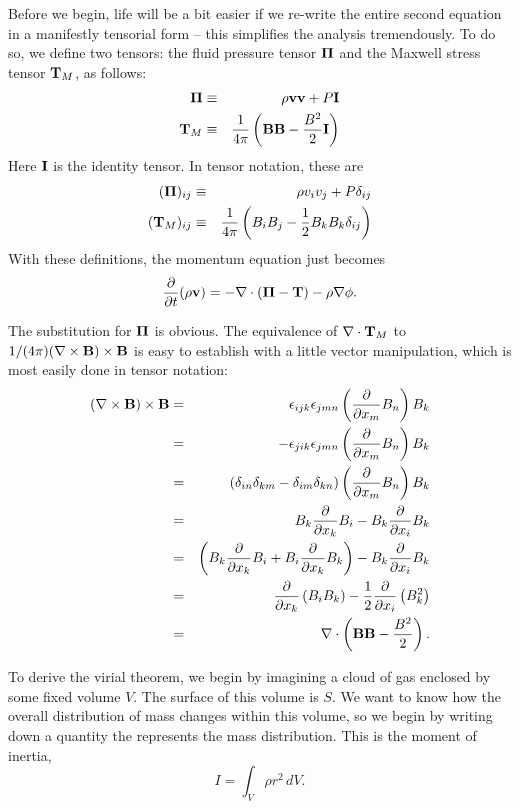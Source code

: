 Before we begin, life will be a bit easier if we re-write the entire second equation in a manifestly tensorial form -- this simplifies the analysis tremendously. To do so, we define two tensors: the fluid pressure tensor $\boldsymbol{\Pi}$ and the Maxwell stress tensor $\mathbf{T}_M$, as follows:
\begin{eqnarray}
\boldsymbol{\Pi} & \equiv & \rho \mathbf{v}\mathbf{v} + P\mathbf{I} \\
\mathbf{T}_M & \equiv & \frac{1}{4\pi} \left(\mathbf{B}\mathbf{B} - \frac{B^2}{2}\mathbf{I}\right)
\end{eqnarray}
Here $\mathbf{I}$ is the identity tensor. In tensor notation, these are
\begin{eqnarray}
(\boldsymbol{\Pi})_{ij} & \equiv & \rho v_i v_j + P \delta_{ij} \\
(\mathbf{T}_M)_{ij} & \equiv & \frac{1}{4\pi} \left(B_i B_j - \frac{1}{2}B_k B_k \delta_{ij}\right)
\end{eqnarray}
With these definitions, the momentum equation just becomes
\begin{equation}
\frac{\partial}{\partial t}(\rho \mathbf{v}) = -\nabla\cdot(\boldsymbol{\Pi}-\mathbf{T}) - \rho \nabla\phi.
\end{equation}

The substitution for $\boldsymbol{\Pi}$ is obvious. The equivalence of $\nabla\cdot\mathbf{T}_M$ to $1/(4\pi) (\nabla\times\mathbf{B})\times\mathbf{B}$ is easy to establish with a little vector manipulation, which is most easily done in tensor notation:
\begin{eqnarray}
(\nabla\times\mathbf{B})\times\mathbf{B} & = & \epsilon_{ijk} \epsilon_{jmn} \left(\frac{\partial}{\partial x_m}B_n\right) B_k \\
& = & -\epsilon_{jik} \epsilon_{jmn} \left(\frac{\partial}{\partial x_m}B_n\right) B_k \\
& = & (\delta_{in}\delta_{km}-\delta_{im}\delta_{kn})\left(\frac{\partial}{\partial x_m}B_n\right) B_k \\
& = & B_k\frac{\partial}{\partial x_k} B_i - B_k\frac{\partial}{\partial x_i} B_k \\
& = & \left(B_k\frac{\partial}{\partial x_k} B_i + B_i \frac{\partial}{\partial x_k} B_k\right) - B_k\frac{\partial}{\partial x_i} B_k \\
& = & \frac{\partial}{\partial x_k}\left(B_i B_k\right) -\frac{1}{2} \frac{\partial}{\partial x_i} \left(B_k^2\right)\\
& = & \nabla\cdot \left(\mathbf{B}\mathbf{B} - \frac{B^2}{2}\right).
\end{eqnarray}

To derive the virial theorem, we begin by imagining a cloud of gas enclosed by some fixed volume $V$. The surface of this volume is $S$. We want to know how the overall distribution of mass changes within this volume, so we begin by writing down a quantity the represents the mass distribution. This is the moment of inertia,
\begin{equation}
I = \int_V \rho r^2\, dV.
\end{equation}

